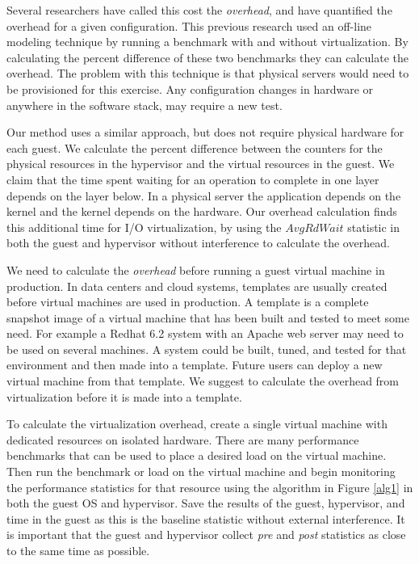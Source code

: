 Several researchers \cite{cherkasova, huber1} have called this cost the \emph{overhead}, and have quantified the overhead for a given configuration.  This previous research used an off-line modeling technique by running a benchmark with and without virtualization.  By calculating the percent difference of these two benchmarks they can calculate the overhead.
The problem with this technique is that physical servers would need to be provisioned for this exercise.  Any configuration changes in hardware or anywhere in the software stack, may require a new test.  

Our method uses a similar approach, but does not require physical hardware for each guest.  We calculate the percent difference between the counters for the physical resources in the hypervisor and the virtual resources in the guest. 
We claim that the time spent waiting for an operation to complete in one layer depends on the layer below.  
In a physical server the application depends on the kernel and the kernel depends on the hardware.  
Our overhead calculation finds this additional time for I/O virtualization, by using the $AvgRdWait$ statistic in both the guest and hypervisor without interference to calculate the overhead.

We need to calculate the \emph{overhead} before running a guest virtual machine in production. 
In data centers and cloud systems, templates are usually created before virtual machines are used in production.  A template is a complete snapshot image of a virtual machine that has been built and tested to meet some need.  For example a Redhat 6.2 system with an Apache web server may need to be used on several machines.  A system could be built, tuned, and tested for that environment and then made into a template.  Future users can deploy a new virtual machine from that template.  We suggest to calculate the overhead from virtualization before it is made into a template.  

To calculate the virtualization overhead, create a single virtual machine with dedicated resources on isolated hardware.  
There are many performance benchmarks that can be used \cite{katcher, tikotekar, hplBench} to place a desired load on the virtual machine. 
Then run the benchmark or load on the virtual machine and begin monitoring the performance statistics for that resource using the algorithm in Figure \ref{alg1} in both the guest OS and hypervisor. 
Save the results of the guest, hypervisor, and time in the guest as this is the baseline statistic without external interference.
It is important that the guest and hypervisor collect \emph{pre} and \emph{post} statistics as close to the same time as possible.  

